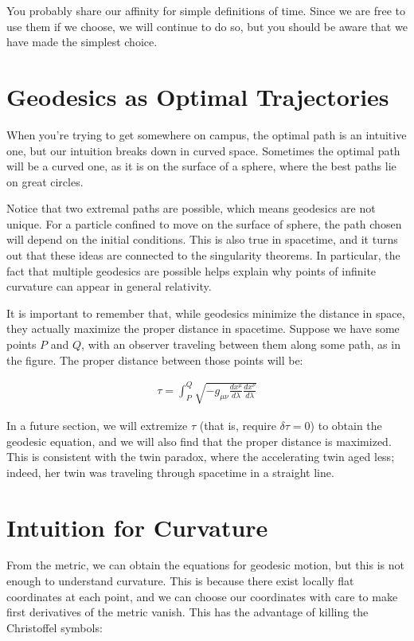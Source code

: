 \documentclass[10pt]{article}
\begin{document}
You probably share our affinity for simple definitions of time. Since we are free to use them if we choose, we will continue to do so, but you should be aware that we have made the simplest choice.

\section{Geodesics as Optimal Trajectories}

When you're trying to get somewhere on campus, the optimal path is an intuitive one, but our intuition breaks down in curved space. Sometimes the optimal path will be a curved one, as it is on the surface of a sphere, where the best paths lie on great circles.

Notice that two extremal paths are possible, which means geodesics are not unique. For a particle confined to move on the surface of sphere, the path chosen will depend on the initial conditions. This is also true in spacetime, and it turns out that these ideas are connected to the singularity theorems. In particular, the fact that multiple geodesics are possible helps explain why points of infinite curvature can appear in general relativity.

It is important to remember that, while geodesics minimize the distance in space, they actually maximize the proper distance in spacetime. Suppose we have some points $P$ and $Q$, with an observer traveling between them along some path, as in the figure. The proper distance between those points will be:

\begin{align}
    \tau = \int_P^Q \sqrt{-g_{\mu \nu} \frac{dx^\mu}{d\lambda} \frac{dx^\nu}{d\lambda}}
\end{align}

In a future section, we will extremize $\tau$ (that is, require $\delta \tau = 0$) to obtain the geodesic equation, and we will also find that the proper distance is maximized. This is consistent with the twin paradox, where the accelerating twin aged less; indeed, her twin was traveling through spacetime in a straight line.

\section{Intuition for Curvature}

From the metric, we can obtain the equations for geodesic motion, but this is not enough to understand curvature. This is because there exist locally flat coordinates at each point, and we can choose our coordinates with care to make first derivatives of the metric vanish. This has the advantage of killing the Christoffel symbols:
\end{document}
